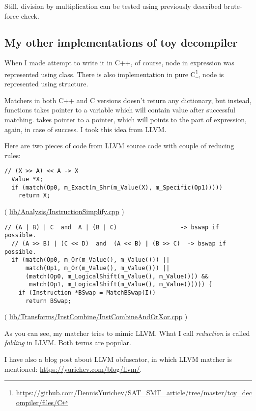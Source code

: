 Still, division by multiplication can be tested using previously described brute-force check.

\subsection{My other implementations of toy decompiler}

When I made attempt to write it in C++, of course, node in expression was represented using class.
There is also implementation in pure C\footnote{\url{https://github.com/DennisYurichev/SAT_SMT_article/tree/master/toy_decompiler/files/C}}, node is represented using structure.

Matchers in both C++ and C versions doesn't return any dictionary, but instead, 
functions takes pointer to a variable which will contain value after successful matching.
 takes pointer to a pointer, which will points to the part of expression, again, in case of success.
I took this idea from LLVM.

Here are two pieces of code from LLVM source code with couple of reducing rules:

\begin{lstlisting}
// (X >> A) << A -> X
  Value *X;
  if (match(Op0, m_Exact(m_Shr(m_Value(X), m_Specific(Op1)))))
    return X;
\end{lstlisting}

( \href{http://llvm.org/docs/doxygen/html/InstructionSimplify_8cpp_source.html}{lib/Analysis/InstructionSimplify.cpp} )

\begin{lstlisting}
// (A | B) | C  and  A | (B | C)                  -> bswap if possible.
  // (A >> B) | (C << D)  and  (A << B) | (B >> C)  -> bswap if possible.
  if (match(Op0, m_Or(m_Value(), m_Value())) ||
      match(Op1, m_Or(m_Value(), m_Value())) ||
      (match(Op0, m_LogicalShift(m_Value(), m_Value())) &&
       match(Op1, m_LogicalShift(m_Value(), m_Value())))) {
    if (Instruction *BSwap = MatchBSwap(I))
      return BSwap;
\end{lstlisting}
( \href{https://github.com/numba/llvm-mirror/blob/master/lib/Transforms/InstCombine/InstCombineAndOrXor.cpp}{lib/Transforms/InstCombine/InstCombineAndOrXor.cpp} )

As you can see, my matcher tries to mimic LLVM.
What I call \textit{reduction} is called \textit{folding} in LLVM.
Both terms are popular.

I have also a blog post about LLVM obfuscator, in which LLVM matcher is mentioned: \url{https://yurichev.com/blog/llvm/}.

